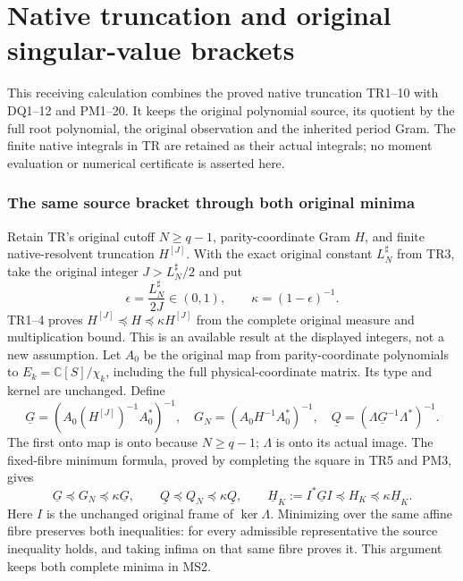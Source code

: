 \documentclass[11pt]{article}
\begin{document}
\endgroup

\clearpage\begingroup
\part*{Native truncation and original singular-value brackets}
\newcommand{\pnativediag}{\operatorname{diag}}
\newcommand{\pnativerank}{\operatorname{rank}}

This receiving calculation combines the proved native truncation
TR1--10 with DQ1--12 and PM1--20. It keeps the original polynomial
source, its quotient by the full root polynomial, the original
observation and the inherited period Gram. The finite native
integrals in TR are retained as their actual integrals; no moment
evaluation or numerical certificate is asserted here.

\section{The same source bracket through both original minima}
Retain TR's original cutoff $N\ge q-1$, parity-coordinate Gram $H$,
and finite native-resolvent truncation $H^{[J]}$. With the exact
original constant $L_N^\sharp$ from TR3, take the original integer
$J>L_N^\sharp/2$ and put
\[
 \epsilon=\frac{L_N^\sharp}{2J}\in(0,1),\qquad
 \kappa=(1-\epsilon)^{-1}.
 \tag{MS1}
\]
TR1--4 proves $H^{[J]}\preceq H\preceq\kappa H^{[J]}$ from
the complete original measure and multiplication bound. This is an
available result at the displayed integers, not a new assumption.
Let $A_0$ be the original map from parity-coordinate polynomials to
$E_k=\mathbb C[S]/\chi_k$, including the full physical-coordinate
matrix. Its type and kernel are unchanged. Define
\[
 \underline G=(A_0(H^{[J]})^{-1}A_0^*)^{-1},\quad
 G_N=(A_0H^{-1}A_0^*)^{-1},\quad
 \underline Q=(\Lambda\underline G^{-1}\Lambda^*)^{-1}.
 \tag{MS2}
\]
The first onto map is onto because $N\ge q-1$; $\Lambda$ is onto
its actual image. The fixed-fibre minimum formula, proved by
completing the square in TR5 and PM3, gives
\[
 \underline G\preceq G_N\preceq\kappa\underline G,\qquad
 \underline Q\preceq Q_N\preceq\kappa\underline Q,\qquad
 \underline H_K:=I^*\underline GI\preceq H_K
                           \preceq\kappa\underline H_K.
 \tag{MS3}
\]
Here $I$ is the unchanged original frame of $\ker\Lambda$.
Minimizing over the same affine fibre preserves both inequalities:
for every admissible representative the source inequality holds,
and taking infima on that same fibre proves it. This argument
keeps both complete minima in MS2.
\end{document}
